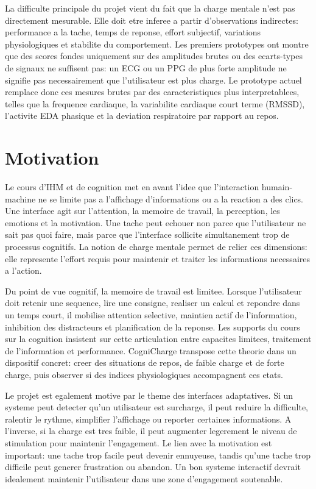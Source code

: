 \documentclass[runningheads]{llncs}
\begin{document}
La difficulte principale du projet vient du fait que la charge mentale n'est pas directement mesurable. Elle doit etre inferee a partir d'observations indirectes: performance a la tache, temps de reponse, effort subjectif, variations physiologiques et stabilite du comportement. Les premiers prototypes ont montre que des scores fondes uniquement sur des amplitudes brutes ou des ecarts-types de signaux ne suffisent pas: un ECG ou un PPG de plus forte amplitude ne signifie pas necessairement que l'utilisateur est plus charge. Le prototype actuel remplace donc ces mesures brutes par des caracteristiques plus interpretablees, telles que la frequence cardiaque, la variabilite cardiaque court terme (RMSSD), l'activite EDA phasique et la deviation respiratoire par rapport au repos.

\section{Motivation}

Le cours d'IHM et de cognition met en avant l'idee que l'interaction humain-machine ne se limite pas a l'affichage d'informations ou a la reaction a des clics. Une interface agit sur l'attention, la memoire de travail, la perception, les emotions et la motivation. Une tache peut echouer non parce que l'utilisateur ne sait pas quoi faire, mais parce que l'interface sollicite simultanement trop de processus cognitifs. La notion de charge mentale permet de relier ces dimensions: elle represente l'effort requis pour maintenir et traiter les informations necessaires a l'action.

Du point de vue cognitif, la memoire de travail est limitee. Lorsque l'utilisateur doit retenir une sequence, lire une consigne, realiser un calcul et repondre dans un temps court, il mobilise attention selective, maintien actif de l'information, inhibition des distracteurs et planification de la reponse. Les supports du cours sur la cognition insistent sur cette articulation entre capacites limitees, traitement de l'information et performance. CogniCharge transpose cette theorie dans un dispositif concret: creer des situations de repos, de faible charge et de forte charge, puis observer si des indices physiologiques accompagnent ces etats.

Le projet est egalement motive par le theme des interfaces adaptatives. Si un systeme peut detecter qu'un utilisateur est surcharge, il peut reduire la difficulte, ralentir le rythme, simplifier l'affichage ou reporter certaines informations. A l'inverse, si la charge est tres faible, il peut augmenter legerement le niveau de stimulation pour maintenir l'engagement. Le lien avec la motivation est important: une tache trop facile peut devenir ennuyeuse, tandis qu'une tache trop difficile peut generer frustration ou abandon. Un bon systeme interactif devrait idealement maintenir l'utilisateur dans une zone d'engagement soutenable.
\end{document}
